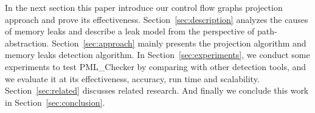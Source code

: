 In the next section this paper introduce our control flow graphs projection approach and prove its effectiveness. Section~\ref{sec:description} analyzes the causes of memory leaks and describe a leak model from the perspective of path-abstraction. Section~\ref{sec:approach} mainly presents the projection algorithm and memory leaks detection algorithm. In Section~\ref{sec:experiments}, we conduct some experiments to test PML\_Checker by comparing with other detection tools, and we evaluate it at its effectiveness, accuracy, run time and scalability. Section~\ref{sec:related} discusses related research. And finally we conclude this work in Section~\ref{sec:conclusion}.
